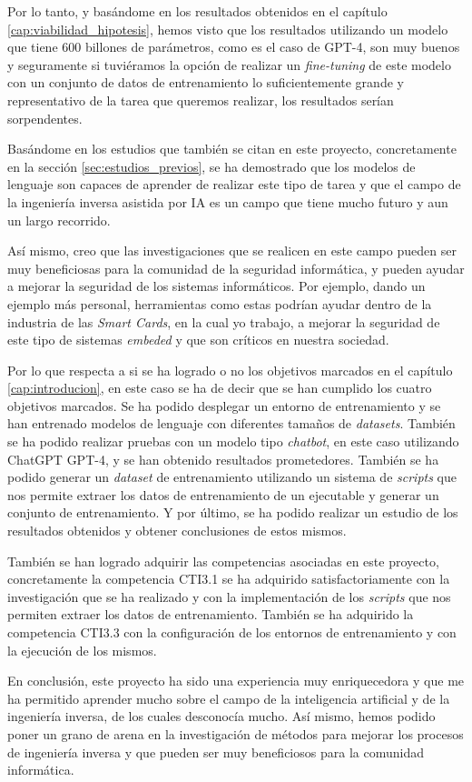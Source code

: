 Por lo tanto, y basándome en los resultados obtenidos en el capítulo \ref{cap:viabilidad_hipotesis},
hemos visto que los resultados utilizando un modelo que tiene 600 billones de parámetros,
como es el caso de GPT-4, son muy buenos y seguramente si tuviéramos la opción de realizar un
\textit{fine-tuning} de este modelo con un conjunto de datos de entrenamiento lo suficientemente
grande y representativo de la tarea que queremos realizar, los resultados serían sorpendentes.

Basándome en los estudios que también se citan en este proyecto, concretamente en la sección
\ref{sec:estudios_previos}, se ha demostrado que los modelos de lenguaje son capaces de aprender
de realizar este tipo de tarea y que el campo de la ingeniería inversa asistida por IA es un campo
que tiene mucho futuro y aun un largo recorrido.

Así mismo, creo que las investigaciones que se realicen en este campo pueden ser muy beneficiosas
para la comunidad de la seguridad informática, y pueden ayudar a mejorar la seguridad de los sistemas
informáticos. Por ejemplo, dando un ejemplo más personal, herramientas como estas podrían ayudar dentro
de la industria de las \textit{Smart Cards}, en la cual yo trabajo, a mejorar la seguridad de este tipo
de sistemas \textit{embeded} y que son críticos en nuestra sociedad.

Por lo que respecta a si se ha logrado o no los objetivos marcados en el capítulo \ref{cap:introducion},
en este caso se ha de decir que se han cumplido los cuatro objetivos marcados. Se ha podido desplegar
un entorno de entrenamiento y se han entrenado modelos de lenguaje con diferentes tamaños de \textit{datasets}.
También se ha podido realizar pruebas con un modelo tipo \textit{chatbot}, en este caso utilizando ChatGPT
GPT-4, y se han obtenido resultados prometedores. También se ha podido generar un \textit{dataset} de entrenamiento
utilizando un sistema de \textit{scripts} que nos permite extraer los datos de entrenamiento de un ejecutable
y generar un conjunto de entrenamiento. Y por último, se ha podido realizar un estudio de los resultados obtenidos
y obtener conclusiones de estos mismos.

También se han logrado adquirir las competencias asociadas en este proyecto, concretamente la
competencia CTI3.1 se ha adquirido satisfactoriamente con la investigación que se ha realizado
y con la implementación de los \textit{scripts} que nos permiten extraer los datos de entrenamiento.
También se ha adquirido la competencia CTI3.3 con la configuración de los entornos de entrenamiento
y con la ejecución de los mismos.

En conclusión, este proyecto ha sido una experiencia muy enriquecedora y que me ha permitido
aprender mucho sobre el campo de la inteligencia artificial y de la ingeniería inversa, de
los cuales desconocía mucho. Así mismo, hemos podido poner un grano de arena en la investigación
de métodos para mejorar los procesos de ingeniería inversa y que pueden ser muy beneficiosos
para la comunidad informática.

